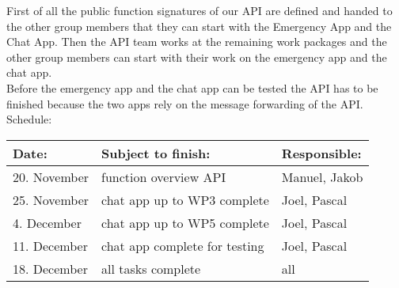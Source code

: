 First of all the public function signatures of our API are defined and handed to the other group members that they can start with the Emergency App and the Chat App. Then the API team works at the remaining work packages and the other group members can start with their work on the emergency app and the chat app. \\[3mm]
Before the emergency app and the chat app can be tested the API has to be finished because the two apps rely on the message forwarding of the API. \\[3mm]
Schedule: \\
\begin{center}
\begin{tabular}{|l|l|l|}
		\hline
		Date: & Subject to finish: & Responsible: \\ \hline
		20. November & function overview API & Manuel, Jakob \\
		25. November & chat app up to WP3 complete & Joel, Pascal \\
		4. December & chat app up to WP5 complete & Joel, Pascal \\
		11. December & chat app complete for testing & Joel, Pascal \\
		18. December & all tasks complete & all\\
		\hline
	\end{tabular}
\end{center}
